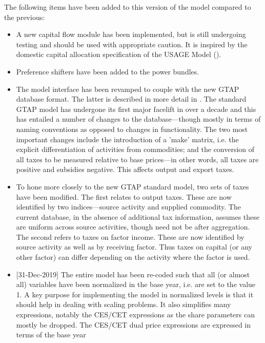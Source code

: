 \documentclass[11pt,letterpaper]{report}
\begin{document}
The following items have been added to this version of the model compared to the
previous:
\begin{itemize}
   \item A new capital flow module has been implemented, but is still undergoing
         testing and should be used with appropriate caution. It is inspired by
         the domestic capital allocation specification of the USAGE Model
         (\cite{DixonRimmer2005}).
   \item Preference shifters have been added to the power bundles.
   \item The model interface has been revamped to couple with the new GTAP
         database format. The latter is described in more detail in
         \cite{CorongetalJGEA2017}. The standard GTAP model has undergone its
         first major facelift in over a decade and this has entailed a number of
         changes to the database---though mostly in terms of naming conventions
         as opposed to changes in functionality. The two most important changes
         include the introduction of a 'make' matrix, i.e. the explicit
         differentiation  of activities from commodities; and the conversion of
         all taxes to be measured relative to base prices---in other words,
         all taxes are positive and subsidies negative. This affects output and
         export taxes.
   \item To hone more closely to the new GTAP standard model, two sets of taxes
         have been modified. The first relates to output taxes. These are now
         identified by two indices---source activity and supplied commodity. The
         current database, in the absence of additional tax information, assumes
         these are uniform across source activities, though need not be after
         aggregation. The second refers to taxes on factor income. These are now
         identified by source activity as well as by receiving factor. Thus
         taxes on capital (or any other factor) can differ depending on the
         activity where the factor is used.
\item {[31-Dec-2019] The entire model has been re-coded such that all (or almost all)
variables have been normalized in the base year, i.e. are set to the value 1.
A key purpose for implementing the model in normalized levels is that it should
help in dealing with scaling problems. It also simplifies many expressions,
notably the CES/CET expressions as the share parameters can mostly be dropped.
The CES/CET dual price expressions are expressed in terms of the base year
}
\end{itemize}
\end{document}
